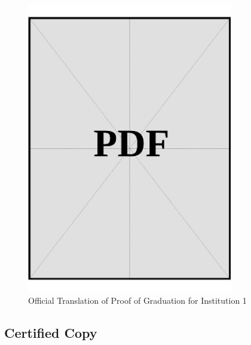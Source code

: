 \begin{figure}[h]
    \centering
    \includegraphics[page=1, width=0.8\textwidth]{../docs/applicant/post-secondary-institutions/institution-1/proof-of-graduation/official-translations.pdf}
    \caption{Official Translation of Proof of Graduation for Institution 1}
    \label{fig:institution-1-proof-of-graduation-official-translation}
\end{figure}

\vspace*{\fill}
\clearpage
\subsection*{Certified Copy}
\vspace*{\fill}

